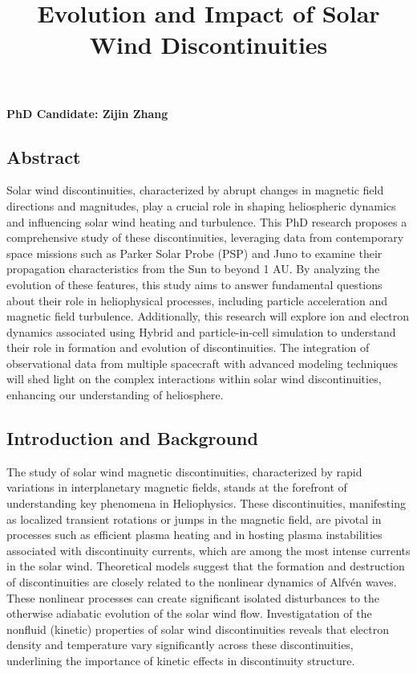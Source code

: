\documentclass[
  letterpaper,
  DIV=11,
  numbers=noendperiod]{scrartcl}
\title{Evolution and Impact of Solar Wind Discontinuities}
\author{}
\date{}
\begin{document}
\maketitle

\textbf{PhD Candidate: Zijin Zhang}

\subsection{Abstract}\label{abstract}

Solar wind discontinuities, characterized by abrupt changes in magnetic field directions and magnitudes, play a crucial role in shaping heliospheric dynamics and influencing solar wind heating and turbulence. This PhD research proposes a comprehensive study of these discontinuities, leveraging data from contemporary space missions such as Parker Solar Probe (PSP) and Juno to examine their propagation characteristics from the Sun to beyond 1 AU. By analyzing the evolution of these features, this study aims to answer fundamental questions about their role in heliophysical processes, including particle acceleration and magnetic field turbulence. Additionally, this research will explore ion and electron dynamics associated using Hybrid and particle-in-cell simulation to understand their role in formation and evolution of discontinuities. The integration of observational data from multiple spacecraft with advanced modeling techniques will shed light on the complex interactions within solar wind discontinuities, enhancing our understanding of heliosphere.

\subsection{Introduction and Background}\label{introduction-and-background}

The study of solar wind magnetic discontinuities, characterized by rapid variations in interplanetary magnetic fields, stands at the forefront of understanding key phenomena in Heliophysics. These discontinuities, manifesting as localized transient rotations or jumps in the magnetic field, are pivotal in processes such as efficient plasma heating and in hosting plasma instabilities associated with discontinuity currents, which are among the most intense currents in the solar wind. Theoretical models suggest that the formation and destruction of discontinuities are closely related to the nonlinear dynamics of Alfvén waves. These nonlinear processes can create significant isolated disturbances to the otherwise adiabatic evolution of the solar wind flow. Investigatation of the nonfluid (kinetic) properties of solar wind discontinuities reveals that electron density and temperature vary significantly across these discontinuities, underlining the importance of kinetic effects in discontinuity structure.
\end{document}
